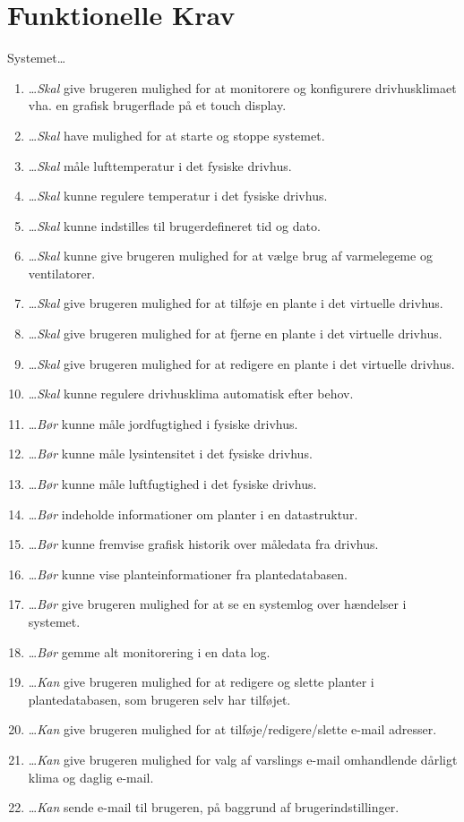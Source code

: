 \section{Funktionelle Krav}
Systemet\ldots
\begin{enumerate}\itemsep1pt \parskip0pt 
	\item \ldots  \emph{Skal} give brugeren mulighed for at monitorere og konfigurere drivhusklimaet vha. en grafisk brugerflade på et touch display.
	\item \ldots \emph{Skal} have mulighed for at starte og stoppe systemet.
	\item \ldots \emph{Skal} måle lufttemperatur i det fysiske drivhus.
	\item \ldots \emph{Skal} kunne regulere temperatur i det fysiske drivhus.
	\item \ldots \emph{Skal} kunne indstilles til brugerdefineret tid og dato.
	\item \ldots \emph{Skal} kunne give brugeren mulighed for at vælge brug af varmelegeme og ventilatorer.
	\item \ldots \emph{Skal} give brugeren mulighed for at tilføje en plante i det virtuelle drivhus.
	\item \ldots \emph{Skal} give brugeren mulighed for at fjerne en plante i det virtuelle drivhus.
	\item \ldots \emph{Skal} give brugeren mulighed for at redigere en plante i det virtuelle drivhus.
	\item \ldots \emph{Skal} kunne regulere drivhusklima automatisk efter behov.
	\item \ldots \emph{Bør} kunne måle jordfugtighed i fysiske drivhus.
	\item \ldots \emph{Bør} kunne måle lysintensitet i det fysiske drivhus.
	\item \ldots \emph{Bør} kunne måle luftfugtighed i det fysiske drivhus.
	\item \ldots \emph{Bør} indeholde informationer om planter i en datastruktur.
	\item \ldots \emph{Bør} kunne fremvise grafisk historik over måledata fra drivhus.
	\item \ldots \emph{Bør} kunne vise planteinformationer fra plantedatabasen.
	\item \ldots \emph{Bør} give brugeren mulighed for at se en systemlog over hændelser i systemet.
	\item \ldots \emph{Bør} gemme alt monitorering i en data log.
	\item \ldots \emph{Kan} give brugeren mulighed for at redigere og slette planter i plantedatabasen, som brugeren selv har tilføjet.
	\item \ldots \emph{Kan} give brugeren mulighed for at tilføje/redigere/slette e-mail adresser.
	\item \ldots \emph{Kan} give brugeren mulighed for valg af varslings e-mail omhandlende dårligt klima og daglig e-mail.
	\item \ldots \emph{Kan} sende e-mail til brugeren, på baggrund af brugerindstillinger.
\end{enumerate}

